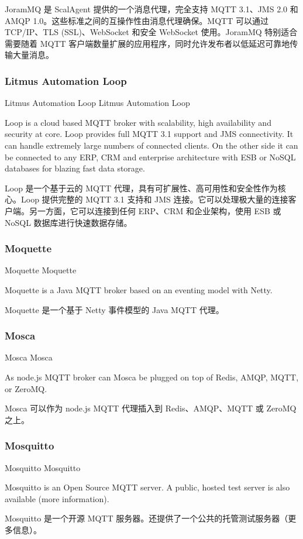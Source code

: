 \documentclass{ctexbook}
\begin{document}
JoramMQ 是 ScalAgent 提供的一个消息代理，完全支持 MQTT 3.1、JMS 2.0 和 AMQP 1.0。这些标准之间的互操作性由消息代理确保。MQTT 可以通过 TCP/IP、TLS (SSL)、WebSocket 和安全 WebSocket 使用。JoramMQ 特别适合需要随着 MQTT 客户端数量扩展的应用程序，同时允许发布者以低延迟可靠地传输大量消息。

\subsubsection{Litmus Automation Loop}
Litmus Automation Loop Litmus Automation Loop

Loop is a cloud based MQTT broker with scalability, high availability and security at core. Loop provides full MQTT 3.1 support and JMS connectivity. It can handle extremely large numbers of connected clients. On the other side it can be connected to any ERP, CRM and enterprise architecture with ESB or NoSQL databases for blazing fast data storage.

Loop 是一个基于云的 MQTT 代理，具有可扩展性、高可用性和安全性作为核心。Loop 提供完整的 MQTT 3.1 支持和 JMS 连接。它可以处理极大量的连接客户端。另一方面，它可以连接到任何 ERP、CRM 和企业架构，使用 ESB 或 NoSQL 数据库进行快速数据存储。

\subsubsection{Moquette}
Moquette Moquette

Moquette is a Java MQTT broker based on an eventing model with Netty.

Moquette 是一个基于 Netty 事件模型的 Java MQTT 代理。

\subsubsection{Mosca}
Mosca Mosca

As node.js MQTT broker can Mosca be plugged on top of Redis, AMQP, MQTT, or ZeroMQ.

Mosca 可以作为 node.js MQTT 代理插入到 Redis、AMQP、MQTT 或 ZeroMQ 之上。

\subsubsection{Mosquitto}
Mosquitto Mosquitto

Mosquitto is an Open Source MQTT server. A public, hosted test server is also available (more information).

Mosquitto 是一个开源 MQTT 服务器。还提供了一个公共的托管测试服务器（更多信息）。
\end{document}
